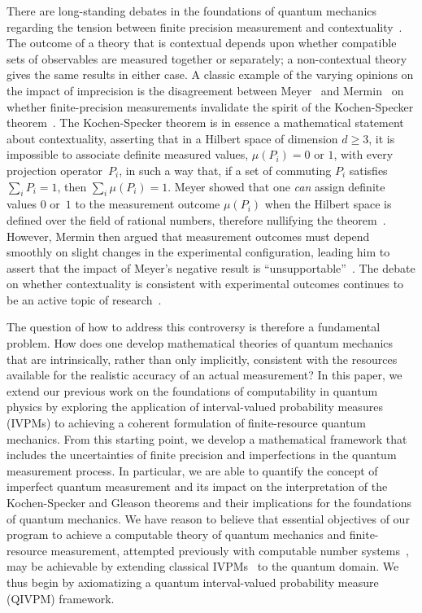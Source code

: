\documentclass[english,reprint, aps, prl,superscriptaddress, showpacs,
showkeys, longbibliography, amsmath, amssymb, floatfix]{revtex4-1}
\theoremstyle{plain}
\theoremstyle{definition}
\begin{document}
There are long-standing debates in the foundations of quantum
mechanics regarding the tension between finite precision measurement
and contextuality~\cite{BarrettKent2004,Appleby_2005}. The outcome
of a theory that is contextual depends upon
whether  compatible sets of observables are measured together or
separately; a non-contextual theory gives the same results in either
case.  A classic example of the varying opinions on the impact of
imprecision is the disagreement between
Meyer~\cite{PhysRevLett.83.3751} and 
Mermin~\cite{Mermin1999}  on whether finite-precision
measurements invalidate the spirit of the Kochen-Specker
theorem~\cite{kochenspecker1967,Redhead1987-REDINA,peres1995quantum,Jaeger2007,Held2016}.  The Kochen-Specker  
theorem is in essence a
mathematical statement about contextuality, asserting that
in a Hilbert space of dimension $d \ge 3$, it is
impossible to associate definite measured values, $\mu(P_i)= 0$ or
$1$, with every projection operator~$P_i$, in such a way that, if a
set of commuting $P_i$ satisfies $\sum_i P_i = 1$, then
$\sum_i \mu(P_i) = 1$.   Meyer showed that one {\it can\/}
assign definite values $0$ or~$1$ to the measurement outcome
$\mu(P_i)$ when the Hilbert space is defined over the field of
rational numbers, therefore nullifying the
theorem~\citep{PhysRevLett.83.3751}.  However, Mermin then argued
that measurement outcomes must depend smoothly on slight changes in
the experimental configuration, leading him to assert that the
impact of Meyer's negative result is
``unsupportable''~\citep{Mermin1999}.  The debate on
whether contextuality is consistent with experimental
outcomes continues to be an active topic of research~\citep{Kent1999,HavlicekKrennSummhammerSvozil2001,SimonBruknerZeilinger2001,Cabello2002,Larsson2002,Appleby2002,BarrettKent2004,Appleby_2005,Spekkens2005,GuehneKleinmannCabelloEtAl2010,MazurekPuseyKunjwalEtAl2016}.

The question of how to address this controversy is therefore a
fundamental problem.  How does one
develop mathematical theories of quantum mechanics that are
intrinsically, rather than only implicitly, consistent with the
resources available for the realistic accuracy of an actual
measurement?   In this paper, we extend our previous work on the
foundations of computability in quantum physics by exploring the
application of interval-valued probability measures (IVPMs) to
achieving a coherent formulation of finite-resource quantum mechanics.
From this starting point, we develop a mathematical framework that includes the
uncertainties of finite precision and imperfections in the quantum
measurement process.  In particular, we are able to quantify the concept of
imperfect quantum measurement and its impact on the interpretation of
the Kochen-Specker and Gleason theorems and their implications for the
foundations of quantum mechanics.  We have reason to believe that
essential objectives of our program to achieve a computable theory of
quantum mechanics and finite-resource measurement, attempted
previously with computable number
systems~\cite{usat,geometry2013apsrev4,DQT2014}, may be achievable by
extending classical IVPMs~\cite{JamisonLodwick2004} to the quantum
domain.  We thus begin by axiomatizing a quantum interval-valued
probability measure (QIVPM) framework.
\end{document}
